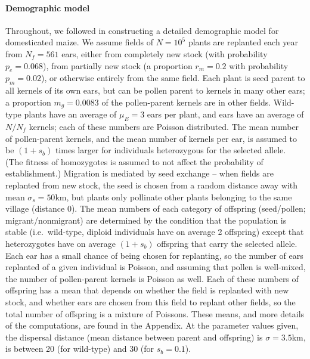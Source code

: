\paragraph{Demographic model}
Throughout, we followed \citet{vanHeerwaarden2010} in constructing a detailed demographic model for domesticated maize.
We assume fields of $N=10^5$ plants are replanted each year from $N_f=561$ ears, either from completely new stock (with probability $p_e=0.068$), from partially new stock (a proportion $r_m=0.2$ with probability $p_m=0.02$), or  otherwise entirely from the same field.
Each plant is seed parent to all kernels of its own ears, but can be pollen parent to kernels in many other ears; a proportion $m_g=0.0083$ of the pollen-parent kernels are in other fields.
Wild-type plants have an average of $\mu_E=3$ ears per plant, and ears have an average of $N/N_f$ kernels; each of these numbers are Poisson distributed.
The mean number of pollen-parent kernels, and the mean number of kernels per ear, is assumed to be $(1+s_b)$ times larger for individuals heterozygous for the selected allele.
(The fitness of homozygotes is assumed to not affect the probability of establishment.)
Migration is mediated by seed exchange -- when fields are replanted from new stock, the seed is chosen from a random distance away with mean $\sigma_s=50$km, but plants only pollinate other plants belonging to the same village (distance 0).
The mean numbers of each category of offspring (seed/pollen; migrant/nonmigrant) are determined by the condition that the population is stable 
(i.e.\ wild-type, diploid individuals have on average 2 offspring) 
except that heterozygotes have on average $(1+s_b)$ offspring that carry the selected allele.
Each ear has a small chance of being chosen for replanting, so the number of ears replanted of a given individual is Poisson, and assuming that pollen is well-mixed, the number of pollen-parent kernels is Poisson as well.
Each of these numbers of offspring has a mean that depends on whether the field is replanted with new stock, and whether ears are chosen from this field to replant other fields, so the total number of offspring is a mixture of Poissons. 
These means, and more details of the computations, are found in the Appendix. %
At the parameter values given, 
the dispersal distance (mean distance between parent and offspring) is $\sigma=3.5$km,
is between 20 (for wild-type) and 30 (for $s_b=0.1$).

